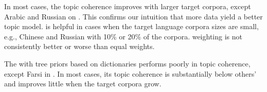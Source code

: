 In most cases, the topic coherence improves with larger target corpora, except Arabic and Russian on \paco.
%
This confirms our intuition that more data yield a better topic model.
%
\mtm is helpful in cases when the target language corpora sizes are
small, e.g., Chinese and Russian with 10\% or 20\% of the corpora.
%
\tfidf weighting is not consistently better or worse
than equal weights.

The \ptlda with tree priors based on dictionaries performs poorly in
topic coherence, except Farsi in \inco.
%
In most cases, its topic coherence is substantially below others' and
improves little when the target corpora grow.

%

%
%
%
